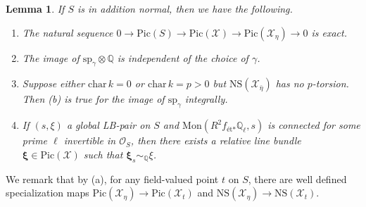 \documentclass[letter, 11pt]{article}
\theoremstyle{plain}
\newtheorem{lemma}[subsubsection]{Lemma}
\theoremstyle{definition}
\newcommand{\IQ}{\mathbb{Q}}
\newcommand\tensor{{\otimes}}
\newcommand{\<}{\langle}
\renewcommand{\>}{\rangle}
\newcommand{\sX}{\mathcal{X}}
\newcommand{\sO}{\mathcal{O}}
\newcommand{\Pic}{\mathrm{Pic}}
\newcommand{\et}{\textrm{{\'e}t}}
\newcommand{\NS}{\mathrm{NS}}
\newcommand{\bxi}{\boldsymbol{\xi}}
\begin{document}
\begin{lemma}
    \label{lem: generic LB}
    If $S$ is in addition normal, then we have the following. 
    \begin{enumerate}[label=\upshape{(\alph*)}]
        \item The natural sequence $0 \to \Pic(S) \to \Pic(\sX) \to \Pic(\sX_\eta) \to 0$ is exact. 
        \item The image of $\mathrm{sp}_\gamma \tensor \IQ$ is independent of the choice of $\gamma$. 
        \item Suppose either $\mathrm{char\,} k = 0$ or $\mathrm{char\,} k = p > 0$ but $\NS(\sX_{\bar{\eta}})$ has no $p$-torsion. Then (b) is true for the image of $\mathrm{sp}_\gamma$ integrally. 
        \item If $(s, \xi)$ a global LB-pair on $S$ and $\mathrm{Mon}(R^2 f_{\et*} \IQ_\ell, s)$ is connected for some prime $\ell$ invertible in $\sO_S$, then there exists a relative line bundle $\bxi \in \Pic(\sX)$ such that $\bxi_s \sim_\IQ \xi$. 
    \end{enumerate} 
\end{lemma} 
We remark that by (a), for any field-valued point $t$ on $S$, there are well defined specialization maps $\Pic(\sX_\eta) \to \Pic(\sX_t)$ and $\NS(\sX_\eta) \to \NS(\sX_t)$.
\end{document}
